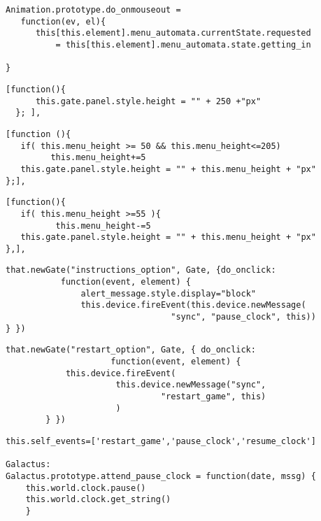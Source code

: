 \begin{lstlisting}[caption=Clase Button, label={lst:code5123}]
Animation.prototype.do_onmouseout = 
   function(ev, el){
      this[this.element].menu_automata.currentState.requested 
          = this[this.element].menu_automata.state.getting_in

}
\end{lstlisting}


\begin{lstlisting}[caption=Estado out, label={lst:code5211}]
  [function(){
      this.gate.panel.style.height = "" + 250 +"px" 
  }; ],
\end{lstlisting}


\begin{lstlisting}[caption=Estado getting\_out, label={lst:code5212}]
[function (){
   if( this.menu_height >= 50 && this.menu_height<=205)
         this.menu_height+=5
   this.gate.panel.style.height = "" + this.menu_height + "px"
};],
\end{lstlisting}


\begin{lstlisting}[caption=Estado getting\_in, label={lst:code5213}]
[function(){
   if( this.menu_height >=55 ){         
          this.menu_height-=5
   this.gate.panel.style.height = "" + this.menu_height + "px"
},],
\end{lstlisting}

\begin{lstlisting}[caption=Instructions\_option Gate, label={lst:code5221}]
that.newGate("instructions_option", Gate, {do_onclick: 
           function(event, element) {
               alert_message.style.display="block"
               this.device.fireEvent(this.device.newMessage(
                                 "sync", "pause_clock", this))
} })
\end{lstlisting}

\begin{lstlisting}[caption=restart\_option, label={lst:code5222}]
 that.newGate("restart_option", Gate, { do_onclick: 
                     function(event, element) {
            this.device.fireEvent(
                      this.device.newMessage("sync", 
                               "restart_game", this)
                      )
        } })
\end{lstlisting}


\begin{lstlisting}[caption=Variable self\_events, label={lst:code5231}]
this.self_events=['restart_game','pause_clock','resume_clock']

Galactus:
Galactus.prototype.attend_pause_clock = function(date, mssg) {
    this.world.clock.pause()
    this.world.clock.get_string()
    }
\end{lstlisting}

